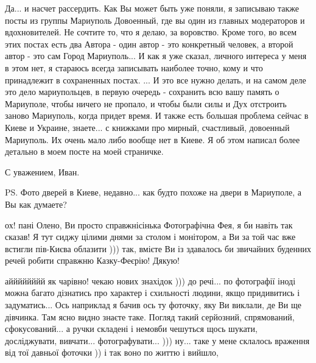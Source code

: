 Да... и насчет рассердить. Как Вы может быть уже поняли, я записываю также
посты из группы Мариуполь Довоенный, где вы один из главных модераторов и
вдохновителей. Не сочтите то, что я делаю, за воровство. Кроме того, во всем
этих постах есть два Автора - один автор - это конкретный человек, а второй
автор - это сам Город Мариуполь... И как я уже сказал, личного интереса у меня
в этом нет, я стараюсь всегда записывать наиболее точно, кому и что принадлежит
в сохраненных постах.  ... И это все нужно делать, и на самом деле это дело
мариупольцев, в первую очередь - сохранить всю вашу память о Мариуполе,  чтобы
ничего не пропало, и чтобы были силы и Дух отстроить заново Мариуполь, когда
придет время.  И также есть большая проблема сейчас в Киеве и Украине,
знаете... с книжками про мирный, счастливый, довоенный Мариуполь. Их очень мало
либо вообще нет в Киеве.  Я об этом написал более детально в моем посте на моей
страничке. 

С уважением, Иван.

PS. Фото дверей в Киеве, недавно... как будто похоже на двери в Мариуполе,
а Вы как думаете?

ох! пані Олено, Ви просто справжнісінька Фотографічна Фея, я би навіть так
сказав! Я тут сиджу цілими днями за столом і монітором, а Ви за той час вже
встигли пів-Києва облазити ))) так, вмієте Ви із здавалось би звичайних
буденних речей робити справжню Казку-Феєрію! Дякую!

айййййййй як чарівно! чекаю нових знахідок ))) до речі... по фотографії іноді
можна багато дізнатись про характер і схильності людини, якщо придивитись і
задуматись...  Ось наприклад я бачив ось ту фоточку, яку Ви виклали, де Ви ще
дівчинка. Там ясно видно знаєте таке. Погляд такий серйозний,
спрямований, сфокусований... а ручки складені і немовби чешуться щось шукати,
досліджувати, вивчати... фотографувати... ))) ну... таке у мене склалось
враження від тої давньої фоточки )) і так воно по життю і вийшло, 
